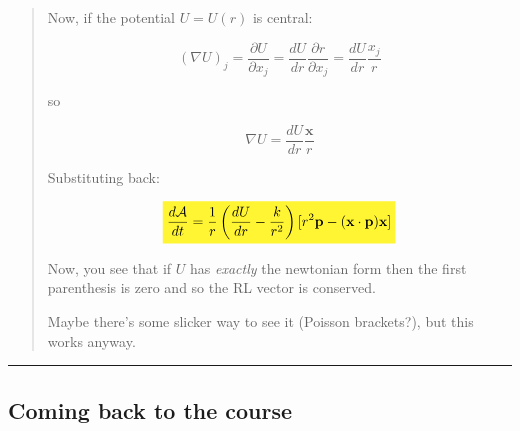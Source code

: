 \documentclass{article}
\numberwithin{equation}{subsection} %
\theoremstyle{definition}
\newcommand{\hlMath}[1]{\colorbox{yellow!80}{$\displaystyle#1$}}
\begin{document}
\begin{quote}
        Now, if the potential $U=U(r)$ is central:

        \begin{equation}
        (\nabla U)_j=\frac{\partial U}{\partial x_j}=\frac{dU}{dr}\frac{\partial r}{\partial x_j}=\frac{dU}{dr}\frac{x_j}{r}
        \end{equation}

        so 

        \begin{equation} \nabla U=\frac{dU}{dr}\frac{\textbf{x}}{r}\end{equation}

        Substituting back:

        \begin{equation}
            \hlMath{\frac{d\mathcal A}{dt}=\frac{1}{r}\left(\frac{dU}{dr}-\frac{k}{r^2}\right)[r^2\textbf{p}-(\textbf{x}\cdot\textbf{p})\textbf{x}]}
        \end{equation}

        Now, you see that if $U$ has \textit{exactly} the newtonian form then the first parenthesis is zero and so the RL vector is conserved. 

        Maybe there's some slicker way to see it (Poisson brackets?), but this works anyway.
    \end{quote}
    \begin{center}\noindent\rule{8cm}{0.4pt}\end{center}
    

    \subsection{Coming back to the course}
\end{document}
